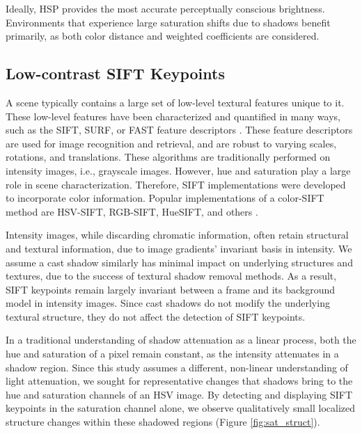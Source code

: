 Ideally, HSP provides the most accurate perceptually conscious brightness. Environments that experience large saturation shifts due to shadows benefit primarily, as both color distance and weighted coefficients are considered.

\subsection{Low-contrast SIFT Keypoints} \label{section:lowcSIFT}

A scene typically contains a large set of low-level textural features unique to it. These low-level features have been characterized and quantified in many ways, such as the SIFT, SURF, or FAST feature descriptors \cite{lowe1999object, bay2008speeded, rosten2006machine}. These feature descriptors are used for image recognition and retrieval, and are robust to varying scales, rotations, and translations. These algorithms are traditionally performed on intensity images, i.e., grayscale images. However, hue and saturation play a large role in scene characterization. Therefore, SIFT implementations were developed to incorporate color information. Popular implementations of a color-SIFT method are HSV-SIFT, RGB-SIFT, HueSIFT, and others \cite{bosch2008scene, geusebroek2001color, van2006boosting, hancolor, tuytelaars2008local, abdel2006csift}.

Intensity images, while discarding chromatic information, often retain structural and textural information, due to image gradients' invariant basis in intensity. We assume a cast shadow similarly has minimal impact on underlying structures and textures, due to the success of textural shadow removal methods. As a result, SIFT keypoints remain largely invariant between a frame and its background model in intensity images. Since cast shadows do not modify the underlying textural structure, they do not affect the detection of SIFT keypoints.

In a traditional understanding of shadow attenuation as a linear process, both the hue and saturation of a pixel remain constant, as the intensity attenuates in a shadow region. Since this study assumes a different, non-linear understanding of light attenuation, we sought for representative changes that shadows bring to the hue and saturation channels of an HSV image. By detecting and displaying SIFT keypoints in the saturation channel alone, we observe qualitatively small localized structure changes within these shadowed regions (Figure \ref{fig:sat_struct}).

